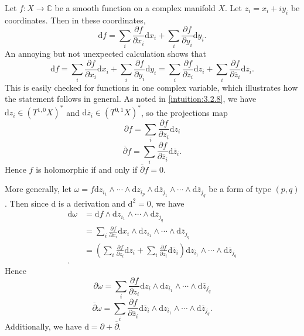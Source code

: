 \begin{discussion}\label{discussion:3.1.14}
	Let $f : X \to \mathbb{C} $ be a smooth function on a complex manifold $X$. Let $z_i = x_i + iy_i$ be coordinates. Then in these coordinates,
	\[
		\mathrm{d} f = \sum_{i} \frac{\partial f}{\partial x_i} \mathrm{d} x_i + \sum_{i} \frac{\partial f}{\partial y_i} \mathrm{d} y_i
	.\]
	An annoying but not unexpected calculation shows that
	\[
		\mathrm{d} f = \sum_{i} \frac{\partial f}{\partial x_i} \mathrm{d} x_i + \sum_{i} \frac{\partial f}{\partial y_i} \mathrm{d} y_i = \sum_{i} \frac{\partial f}{\partial z_i} \mathrm{d} z_i + \sum_{i} \frac{\partial f}{\partial \overline{z} _i} \mathrm{d} \overline{z} _i
	.\]
	This is easily checked for functions in one complex variable, which illustrates how the statement follows in general. As noted in \cref{intuition:3.2.8}, we have $\mathrm{d} z_i\in (T^{1,0} X)^*$ and $\mathrm{d} \overline{z} _i\in (T^{0,1} X)^*$, so the projections map
	\[
		\partial f = \sum_{i} \frac{\partial f}{\partial z_i} \mathrm{d} z_i
	\]
	\[
		\overline{\partial } f=\sum_{i} \frac{\partial f}{\partial \overline{z} _i} \mathrm{d} \overline{z} _i
	.\]
	Hence $f$ is holomorphic if and only if $\overline{\partial } f=0$.

	More generally, let $\omega =f \mathrm{d} z_{i_1} \wedge \cdots \wedge \mathrm{d} z_{i_p} \wedge \mathrm{d} \overline{z} _{j_1} \wedge \cdots \wedge \mathrm{d} \overline{z} _{j_q} $ be a form of type $(p,q)$. Then since $\mathrm{d} $ is a derivation and $\mathrm{d} ^2=0$, we have
	\begin{align*}
		\mathrm{d} \omega &=\mathrm{d} f\wedge \mathrm{d} z_{i_1} \wedge \cdots \wedge \mathrm{d} \overline{z} _{j_q} \\
				  &=\sum_{i} \frac{\partial f}{\partial x_i} \mathrm{d} x_i \wedge \mathrm{d} z_{i_1} \wedge \cdots \wedge \mathrm{d} \overline{z} _{j_q} \\
				  &=\left( \sum_{i} \frac{\partial f}{\partial z_i} \mathrm{d} z_i + \sum_{i} \frac{\partial f}{\partial \overline{z} _i} \mathrm{d} \overline{z} _i \right) \mathrm{d} z_{i_1} \wedge \cdots \wedge \mathrm{d} \overline{z} _{j_q} \\
	.\end{align*}
	Hence
	\[
		\partial \omega =\sum_{i} \frac{\partial f}{\partial z_i} \mathrm{d} z_i  \wedge \mathrm{d} z_{i_1} \wedge \cdots \wedge \mathrm{d} \overline{z} _{j_q}
	\]
	\[
		\overline{\partial } \omega =\sum_{i} \frac{\partial f}{\partial \overline{z}_i} \mathrm{d} \overline{z}_i \wedge  \mathrm{d} z_{i_1} \wedge \cdots \wedge \mathrm{d} \overline{z} _{j_q}
	.\]
	Additionally, we have $\mathrm{d}=\partial + \overline{\partial } $.
\end{discussion}

